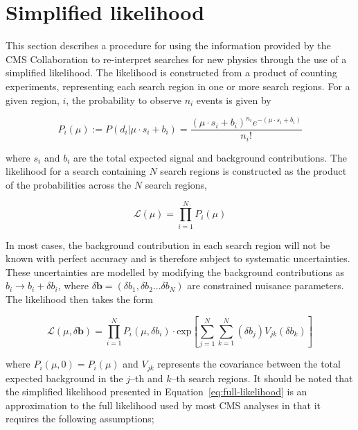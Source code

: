 \section{Simplified likelihood}
\label{sec:simplified-likelihood}

This section describes a procedure for using the information provided by the CMS Collaboration to 
re-interpret searches for new physics through the use of a simplified likelihood. The likelihood is 
constructed from a product of counting experiments, representing each search region in one or more search regions. 
For a given region, $i$, the probability to observe $n_{i}$ events is given by

\begin{equation}
 P_{i}(\mu) := P(d_{i}|\mu \cdot s_{i}+b_{i}) = \dfrac{(\mu \cdot s_{i}+b_{i})^{n_{i}} e^{-(\mu \cdot s_{i}+b_{i})} }{n_{i}!}
\label{eq:poisson-likelihood}
\end{equation}

where $s_{i}$ and $b_{i}$ are the total expected signal and background contributions. 
The likelihood for a search containing $N$ search regions is constructed as the product 
of the probabilities across the $N$ search regions, 

\begin{equation}
\mathcal{L}(\mu) = \prod_{i=1}^{N} P_{i}(\mu)
\label{eq:stat-likelihood}
\end{equation}

In most cases, the background contribution in each search region will not be known with perfect accuracy and is therefore 
subject to systematic uncertainties. These uncertainties are modelled by modifying the background contributions as 
$b_{i}\rightarrow b_{i}+\delta b_{i}$, where $\delta\mathbf{b}=(\delta b_{1},\delta b_{2}...\delta b_{N})$ are constrained nuisance parameters. The likelihood then takes the form

\begin{equation}
\mathcal{L}(\mu, \delta \mathbf{b}) = \prod_{i=1}^{N} P_{i}(\mu,\delta b_{i}) \cdot \mathrm{exp} \left[ \sum_{j=1}^{N}\sum_{k=1}^{N} (\delta b_{j}) V_{jk} (\delta b_{k}) \right]
\label{eq:full-likelihood}
\end{equation}

where $P_{i}(\mu,0)=P_{i}(\mu)$ and $V_{jk}$ represents the covariance between
the total expected background in the $j$--th and $k$--th search regions. It should be noted that 
the simplified likelihood presented in Equation~\ref{eq:full-likelihood} is an approximation to the full likelihood used 
by most CMS analyses in that it requires the following assumptions;

